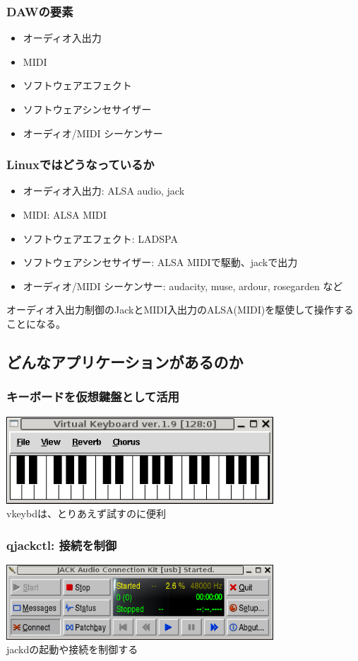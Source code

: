 \documentclass[cjk,dvipdfmx]{beamer}
\begin{document}
\begin{frame}
\frametitle{DAWの要素}
 \begin{itemize}
  \item オーディオ入出力
  \item MIDI
  \item ソフトウェアエフェクト
  \item ソフトウェアシンセサイザー
  \item オーディオ/MIDI シーケンサー
 \end{itemize}
\end{frame}

\begin{frame}
\frametitle{Linuxではどうなっているか}
 \begin{itemize}
  \item オーディオ入出力: ALSA audio, jack
  \item MIDI: ALSA MIDI
  \item ソフトウェアエフェクト: LADSPA
  \item ソフトウェアシンセサイザー: ALSA MIDIで駆動、jackで出力
  \item オーディオ/MIDI シーケンサー: audacity, muse, ardour, rosegarden
	など
 \end{itemize}
 オーディオ入出力制御のJackとMIDI入出力のALSA(MIDI)を駆使して操作することになる。
\end{frame}

 \subsection{どんなアプリケーションがあるのか}
\begin{frame}
 \frametitle{キーボードを仮想鍵盤として活用}
\includegraphics[width=10cm]{image200602/vkeybd.png}\\
 vkeybdは、とりあえず試すのに便利
\end{frame}

\begin{frame}
 \frametitle{qjackctl: 接続を制御}
\includegraphics[width=10cm]{image200602/qjackctl-1.png}\\
jackdの起動や接続を制御する
\end{frame}
\end{document}
